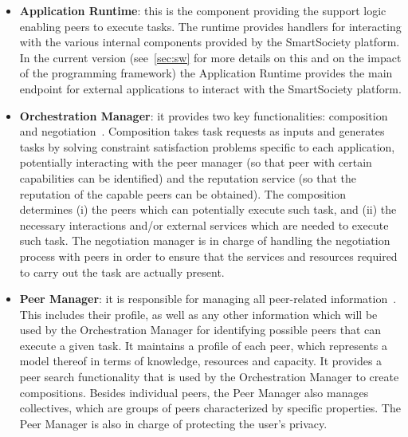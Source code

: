 \begin{itemize}
\item \textbf{Application Runtime}: this is the component providing the support logic enabling peers to execute tasks. The runtime provides handlers for interacting with the various internal components provided by the SmartSociety platform. In the current version (see~\ref{sec:sw} for more details on this and on the impact of the programming framework) the Application Runtime provides the main endpoint for external applications to interact with the SmartSociety platform. %

\item \textbf{Orchestration Manager}: it provides two key functionalities: composition and negotiation~\cite{D6.2}. Composition takes task requests as inputs and generates tasks by solving constraint satisfaction problems specific to each application, potentially interacting with the peer manager (so that peer with certain capabilities can be identified) and the reputation service (so that the reputation of the capable peers can be obtained). The composition determines (i) the peers which can potentially execute such task, and (ii) the necessary interactions and/or external services which are needed to execute such task.  The negotiation manager is in charge of handling the negotiation process with peers in order to ensure that the services and resources required to carry out the task are actually present. %

\item \textbf{Peer Manager}: it is responsible for managing all peer-related information~\cite{D4.3}. This includes their profile, as well as any other information which will be used by the Orchestration Manager for identifying possible peers that can execute a given task.  It maintains a profile of each peer, which
represents a model thereof in terms of knowledge, resources and
capacity. It provides a peer search functionality that is used by the Orchestration Manager to create compositions. Besides individual peers, the Peer Manager also manages collectives, which are groups of peers characterized by specific properties. %
The Peer Manager is also in charge of protecting the user's privacy. 


\end{itemize}
